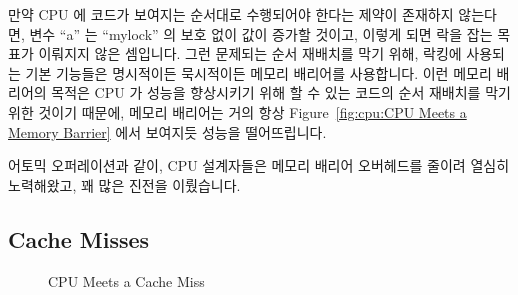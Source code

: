만약 CPU 에 코드가 보여지는 순서대로 수행되어야 한다는 제약이 존재하지
않는다면, 변수 ``a'' 는 ``mylock'' 의 보호 없이 값이 증가할 것이고, 이렇게 되면
락을 잡는 목표가 이뤄지지 않은 셈입니다.
그런 문제되는 순서 재배치를 막기 위해, 락킹에 사용되는 기본 기능들은 명시적이든
묵시적이든 메모리 배리어를 사용합니다.
이런 메모리 배리어의 목적은 CPU 가 성능을 향상시키기 위해 할 수 있는 코드의
순서 재배치를 막기 위한 것이기 때문에, 메모리 배리어는 거의 항상
Figure~\ref{fig:cpu:CPU Meets a Memory Barrier} 에서 보여지듯 성능을
떨어뜨립니다.

어토믹 오퍼레이션과 같이, CPU 설계자들은 메모리 배리어 오버헤드를 줄이려 열심히
노력해왔고, 꽤 많은 진전을 이뤘습니다.

\subsection{Cache Misses}
\label{sec:cpu:Cache Misses}

\begin{figure}[tb]
\centering
{}
\caption{CPU Meets a Cache Miss}
\end{figure}

